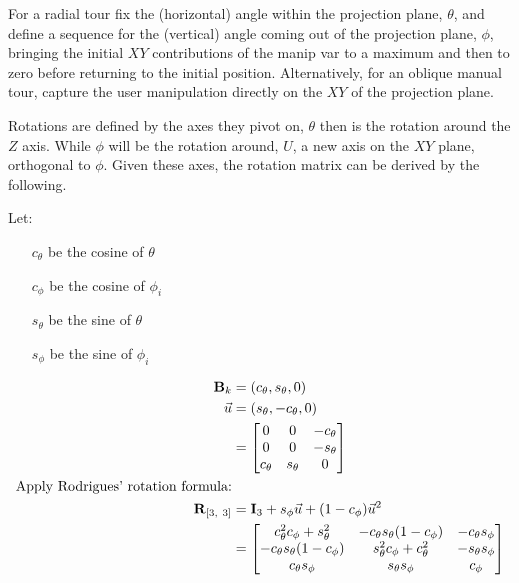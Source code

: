 For a radial tour fix the (horizontal) angle within the projection
plane, \(\theta\), and define a sequence for the (vertical) angle coming
out of the projection plane, \(\phi\), bringing the initial \(XY\)
contributions of the manip var to a maximum and then to zero before
returning to the initial position. Alternatively, for an oblique manual
tour, capture the user manipulation directly on the \(XY\) of the
projection plane.

Rotations are defined by the axes they pivot on, \(\theta\) then is the
rotation around the \(Z\) axis. While \(\phi\) will be the rotation
around, \(U\), a new axis on the \(XY\) plane, orthogonal to \(\phi\).
Given these axes, the rotation matrix can be derived by the following.

Let:

\begin{itemize}
  \item[$c_\theta$] be the cosine of $\theta$
  \item[$c_\phi$]   be the cosine of $\phi_i$
  \item[$s_\theta$] be the sine of   $\theta$
  \item[$s_\phi$]   be the sine of   $\phi_i$
\end{itemize}

\begin{align*}
  \textbf{B}_k &= (c_\theta, s_\theta, 0) \\
  \vec{u} &= (s_\theta, -c_\theta, 0) \\ &=
  \begin{bmatrix}
     0 & 0 & -c_\theta \\
     0 & 0 & -s_\theta \\
     c_\theta & s_\theta & 0 \\
   \end{bmatrix} \\
  \text{Apply Rodrigues' rotation formula:} \\
    \textbf{R}_{[3,~3]} 
    &= \textbf{I}_3 + s_\phi\*\vec{u} + (1-c_\phi)\*\vec{u}^2 \\
    &= 
    \begin{bmatrix}
      c_\theta^2 c_\phi + s_\theta^2 &
      -c_\theta s_\theta (1 - c_\phi) &
      -c_\theta s_\phi \\
      -c_\theta s_\theta (1 - c_\phi) &
      s_\theta^2 c_\phi + c_\theta^2 &
      -s_\theta s_\phi \\
      c_\theta s_\phi &
      s_\theta s_\phi &
      c_\phi
    \end{bmatrix}
\end{align*}

